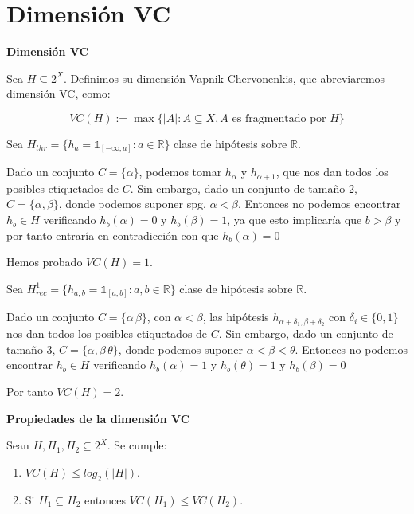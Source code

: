 \section{Dimensión VC}

\begin{definition}
\textbf{Dimensión VC}

Sea $H \subseteq 2^X$. Definimos su dimensión Vapnik-Chervonenkis, que abreviaremos dimensión VC, como:

\[VC(H) := \max \{|A| : A\subseteq X, A \textrm{ es fragmentado por } H\}\]
\end{definition}


\begin{example}

Sea $H_{thr} = \{h_a = \mathds{1}_{[-\infty, a]}: a\in \mathbb{R}\}$ clase de hipótesis sobre $\mathbb{R}$. 

Dado un conjunto $C=\{\alpha\}$, podemos tomar $h_{\alpha}$ y $h_{\alpha+1}$, que nos dan todos los posibles etiquetados de $C$.
Sin embargo, dado un conjunto de tamaño 2, $C=\{\alpha, \beta\}$, donde podemos suponer spg. $\alpha < \beta$. Entonces no podemos encontrar $h_b \in H$ verificando $h_b(\alpha)=0$ y $h_b(\beta) = 1$, ya que esto implicaría que $b > \beta$ y por tanto entraría en contradicción con que $h_b(\alpha) = 0$

Hemos probado $VC(H) = 1$.

\end{example}

\begin{example}

Sea $H^1_{rec} = \{h_{a,b} = \mathds{1}_{[a,b]}: a,b\in \mathbb{R}\}$ clase de hipótesis sobre $\mathbb{R}$. 

Dado un conjunto $C=\{\alpha\, \beta\}$, con $\alpha < \beta$, las hipótesis $h_{\alpha+\delta_1, \beta + \delta_2}$ con $\delta_i \in \{0,1\}$ nos dan todos los posibles etiquetados de $C$.
Sin embargo, dado un conjunto de tamaño 3, $C=\{\alpha, \beta\, \theta\}$, donde podemos suponer $\alpha < \beta < \theta$. Entonces no podemos encontrar $h_b \in H$ verificando $h_b(\alpha)=1$ y $h_b(\theta) = 1$ y $h_b(\beta) = 0$

Por tanto $VC(H) = 2$.
\end{example}

\begin{fact} \textbf{Propiedades de la dimensión VC}

Sean $H,H_1, H_2 \subseteq 2^X$. Se cumple:

\begin{enumerate}[i]
 \item $VC(H) \le log_2(|H|)$.
 \item Si $H_1 \subseteq H_2$ entonces $VC(H_1) \le VC(H_2)$.
\end{enumerate}

\end{fact}

